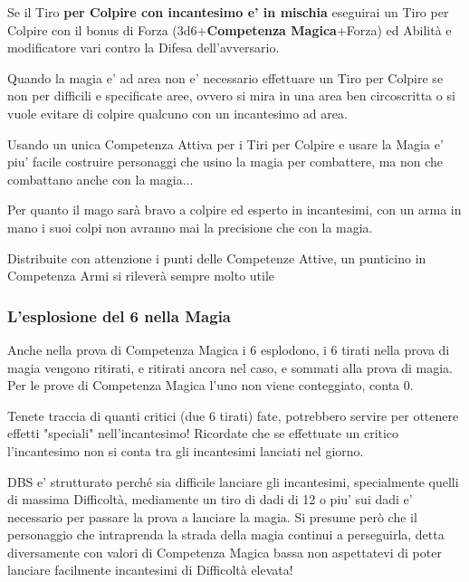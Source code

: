 \begin{multicols}{2}
\medskip

Se il Tiro \textbf{per Colpire con incantesimo e' in mischia} eseguirai un Tiro per Colpire con il bonus di Forza (3d6+\textbf{Competenza Magica}+Forza) ed Abilità e modificatore vari contro la Difesa dell'avversario.

\medskip

Quando la magia e' ad area non e' necessario effettuare un Tiro per Colpire se non per difficili e specificate aree, ovvero si mira in una area ben circoscritta o si vuole evitare di colpire qualcuno con un incantesimo ad area.

\medskip

\begin{tcolorbox}[enhanced,arc=5pt,boxrule=0.3pt,width=0.85\linewidth,title=Personaggi Gish]
Usando un unica Competenza Attiva per i Tiri per Colpire e usare la Magia e' piu' facile costruire personaggi che usino la magia per combattere, ma non che combattano anche con la magia...

Per quanto il mago sarà bravo a colpire ed esperto in incantesimi, con un arma in mano i suoi colpi non avranno mai la precisione che con la magia.

Distribuite con attenzione i punti delle Competenze Attive, un punticino in Competenza Armi si rileverà sempre molto utile\end{tcolorbox}


\subsubsection{L'esplosione del 6 nella Magia}

Anche nella prova di Competenza Magica i 6 esplodono, i 6 tirati nella prova di magia vengono ritirati, e ritirati ancora nel caso, e sommati alla prova di magia. Per le prove di Competenza Magica l'uno non viene conteggiato, conta 0.

Tenete traccia di quanti critici (due 6 tirati) fate, potrebbero servire per ottenere effetti "speciali" nell'incantesimo! Ricordate che se effettuate un critico l'incantesimo non si conta tra gli incantesimi lanciati nel giorno.


\begin{tcolorbox}[enhanced,arc=5pt,boxrule=0.3pt,width=0.85\linewidth,title = La Prova di Magia] DBS e' strutturato perché sia difficile lanciare gli incantesimi, specialmente quelli di massima Difficoltà, mediamente un tiro di dadi di 12 o piu' sui dadi e' necessario per passare la prova a lanciare la magia. Si presume però che il personaggio che intraprenda la strada della magia continui a perseguirla, detta diversamente con valori di Competenza Magica bassa non aspettatevi di poter lanciare facilmente incantesimi di Difficoltà elevata!	
\end{tcolorbox}


\end{multicols}
